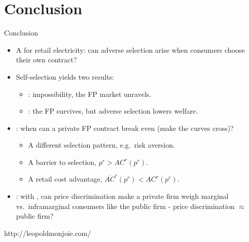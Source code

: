 \documentclass{class}
\begin{document}
\section{Conclusion}



\begin{frame}{Conclusion}

\begin{itemize}
    \item A  for retail electricity: can adverse selection arise when consumers choose their own contract? \vfill

    \item Self-selection yields two results: \vfill
    \begin{itemize}
        \item {}: impossibility, the FP market unravels. \vfill
        \item {}: the FP survives, but adverse selection lowers welfare. \vfill
    \end{itemize}

    \item {}: when can a private FP contract break even (make the curves cross)? \vfill
    \begin{itemize}
        \item A different selection pattern, e.g.\ risk aversion. \vfill
        \item A barrier to selection, $p^r > AC^r(p^r)$. \vfill
        \item A retail cost advantage, $\overline{AC}^r(p^r) < AC^r(p^r)$. \vfill
    \end{itemize}

\item {}: with , can price discrimination make a private firm weigh marginal vs.\ inframarginal consumers like the public firm - price discrimination $\approx$ public firm?

\end{itemize}

\end{frame}



\begin{frame}{}
  
  \vspace{1cm}

  http://leopoldmonjoie.com/
\end{frame}

\end{document}
